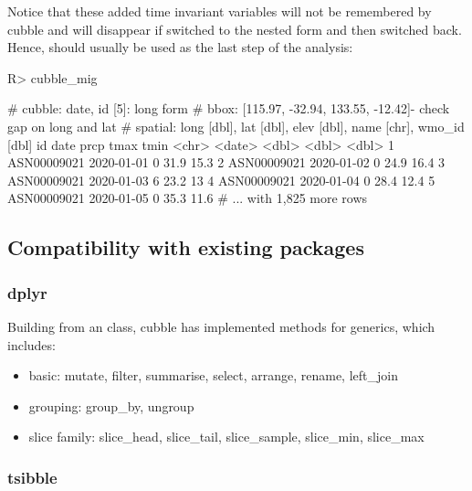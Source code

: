 \documentclass[
]{jss}
\providecommand{\tightlist}{%
  \setlength{\itemsep}{0pt}\setlength{\parskip}{0pt}}
\begin{document}
Notice that these added time invariant variables will not be remembered
by cubble and will disappear if switched to the nested form and then
switched back. Hence,  should usually be used as the
last step of the analysis:

\begin{CodeChunk}
\begin{CodeInput}
R> cubble_mig %
\end{CodeInput}
\begin{CodeOutput}
# cubble:  date, id [5]: long form
# bbox:    [115.97, -32.94, 133.55, -12.42]- check gap on long and lat
# spatial: long [dbl], lat [dbl], elev [dbl], name [chr], wmo_id [dbl]
  id          date        prcp  tmax  tmin
  <chr>       <date>     <dbl> <dbl> <dbl>
1 ASN00009021 2020-01-01     0  31.9  15.3
2 ASN00009021 2020-01-02     0  24.9  16.4
3 ASN00009021 2020-01-03     6  23.2  13  
4 ASN00009021 2020-01-04     0  28.4  12.4
5 ASN00009021 2020-01-05     0  35.3  11.6
# ... with 1,825 more rows
\end{CodeOutput}
\end{CodeChunk}

\hypertarget{compatibility-with-existing-packages}{%
\subsection{Compatibility with existing
packages}\label{compatibility-with-existing-packages}}

\hypertarget{dplyr}{%
\subsubsection{dplyr}\label{dplyr}}

Building from an  class, cubble has implemented methods for
 generics, which includes:

\begin{itemize}
\tightlist
\item
  basic: mutate, filter, summarise, select, arrange, rename, left\_join
\item
  grouping: group\_by, ungroup
\item
  slice family: slice\_head, slice\_tail, slice\_sample, slice\_min,
  slice\_max
\end{itemize}

\hypertarget{tsibble}{%
\subsubsection{tsibble}\label{tsibble}}
\end{document}
